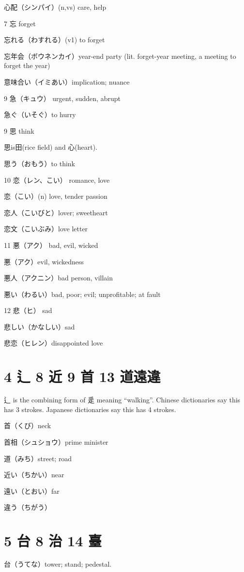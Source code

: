 心配（シンパイ）(n,vs) care, help

7 忘 forget

忘れる（わすれる）(v1) to forget

忘年会（ボウネンカイ）year-end party (lit. forget-year meeting, a meeting to forget the year)

意味合い（イミあい）implication; nuance

9 急（キュウ） urgent, sudden, abrupt

急ぐ（いそぐ）to hurry

9 思 think

思is田(rice field) and 心(heart).

思う（おもう）to think

10 恋（レン、こい） romance, love

恋（こい）(n) love, tender passion

恋人（こいびと）lover; sweetheart

恋文（こいぶみ）love letter

11 悪（アク） bad, evil, wicked

悪（アク）evil, wickedness

悪人（アクニン）bad person, villain

悪い（わるい）bad, poor; evil; unprofitable; at fault

12 悲（ヒ） sad

悲しい（かなしい）sad

悲恋（ヒレン）disappointed love

\section{4 辶 8 近 9 首 13 道遠違}

辶 is the combining form of 辵 meaning ``walking''.
Chinese dictionaries say this has 3 strokes.
Japanese dictionaries say this has 4 strokes.

首（くび）neck

首相（シュショウ）prime minister

道（みち）street; road

近い（ちかい）near

遠い（とおい）far

違う（ちがう）

\section{5 台 8 治 14 臺}

台（うてな）tower; stand; pedestal.

